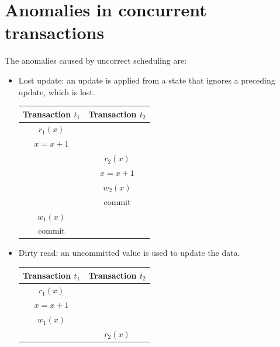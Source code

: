 \documentclass[12pt, a4paper]{report}
\begin{document}
    \section{Anomalies in concurrent transactions}
    The anomalies caused by uncorrect scheduling are: 
    \begin{itemize}
        \item Lost update: an update is applied from a state that ignores a preceding update, which is lost.
            \begin{table}[H]
                \centering
                \begin{tabular}{c|c}
                \textbf{Transaction $t_1$}    & \textbf{Transaction $t_2$} \\ \hline
                $r_1(x)$                      &                            \\
                $x=x+1$                       &                            \\
                                              & $r_2(x)$                   \\
                                              & $x=x+1$                    \\
                                              & $w_2(x)$                   \\
                                              & commit                     \\
                $w_1(x)$                      &                            \\
                commit                        &                           
                \end{tabular}
            \end{table}
        \item Dirty read: an uncommitted value is used to update the data. 
            \begin{table}[H]
                \centering
                \begin{tabular}{c|c}
                \textbf{Transaction $t_1$} & \textbf{Transaction $t_2$} \\ \hline
                $r_1(x)$                   &                            \\
                $x=x+1$                    &                            \\
                $w_1(x)$                   &                            \\
                                        & $r_2(x)$                   \\

\end{tabular}
\end{table}
\end{itemize}
\end{document}
